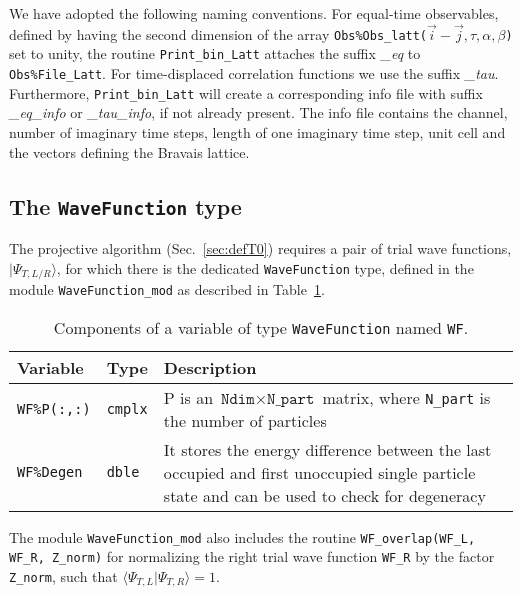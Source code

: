 We have adopted the following naming conventions.
For equal-time observables, defined by having the second dimension of the array  \texttt{Obs\%Obs\_latt($\vec{i}-\vec{j},\tau,\alpha,\beta$)}   set to unity, 
the routine \texttt{Print\_bin\_Latt}  attaches the suffix \emph{\_eq} to \texttt{Obs\%File\_Latt}.  For time-displaced correlation functions we use the suffix \emph{\_tau}. 
Furthermore, \texttt{Print\_bin\_Latt} will create a corresponding info file with suffix \emph{\_eq\_info} or \emph{\_tau\_info}, if not already present. The info file contains the channel, number of imaginary time steps, length of one imaginary time step, unit cell and the vectors defining the Bravais lattice.

\subsection{The \texttt{WaveFunction} type} \label{sec:wave_function}

The projective algorithm (Sec.~\ref{sec:defT0}) requires a pair of trial wave functions,  $| \Psi_{T,L/R} \rangle $, for which there is the dedicated  \texttt{WaveFunction} type, defined in the module \texttt{WaveFunction\_mod} as described in Table~\ref{table:wavefunction}.
%
\begin{table}[h!]
	\begin{center}
		\begin{tabular}{@{} p{} p{} p{}  @{}}\toprule
			Variable               & Type           &  Description \\\midrule
			\texttt{WF\%P(:,:)}    & \texttt{cmplx} &  P is an $\texttt{Ndim}\times\texttt{N\_part}$ matrix, where \texttt{N\_part} is the number of particles\\
			\texttt{WF\%Degen}     & \texttt{dble}  &  It stores the energy difference between the last occupied and first unoccupied single particle state and can be used to check for degeneracy\\\bottomrule
		\end{tabular}
		\caption{Components of a variable of type \texttt{WaveFunction} named \texttt{WF}.}
		\label{table:wavefunction}
	\end{center}
\end{table}
%

The module \texttt{WaveFunction\_mod} also includes the routine \texttt{WF\_overlap(WF\_L, WF\_R, Z\_norm)} for normalizing the right trial wave function \texttt{WF\_R} by the factor \texttt{Z\_norm}, such that $\langle \Psi_{T,L} | \Psi_{T,R} \rangle = 1$.



